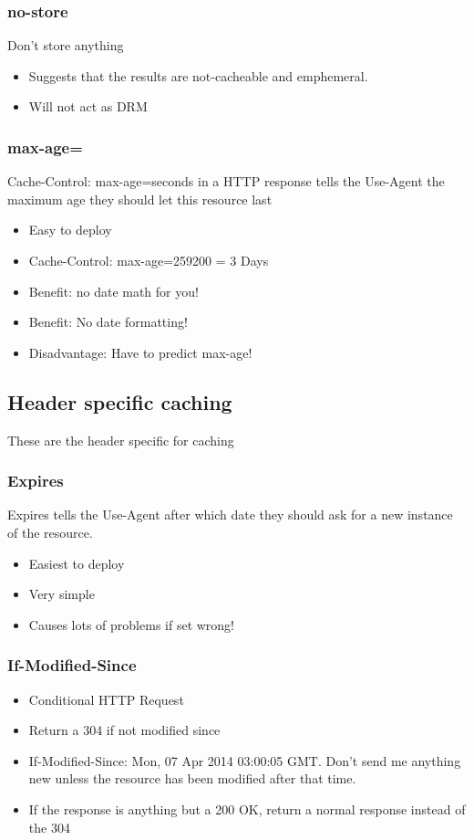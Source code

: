 \documentclass[../CMPUT-404-Notes.tex]{subfiles}
\begin{document}
\subsubsection{no-store}
Don't store anything
\begin{itemize}
    \item Suggests that the results are not-cacheable
    and emphemeral.
    \item Will not act as DRM
\end{itemize}

\subsubsection{max-age=}
Cache-Control: max-age=seconds in a HTTP
response tells the Use-Agent the maximum
age they should let this resource last
\begin{itemize}
    \item Easy to deploy
    \item Cache-Control: max-age=259200 = 3 Days
    \item Benefit: no date math for you!
    \item Benefit: No date formatting!
    \item Disadvantage: Have to predict max-age!
\end{itemize}

\subsection{Header specific caching}
These are the header specific for caching

\subsubsection{Expires}
Expires tells the Use-Agent after which date
they should ask for a new instance of the
resource.
\begin{itemize}
    \item Easiest to deploy
    \item Very simple
    \item Causes lots of problems if set wrong!
\end{itemize}

\subsubsection{If-Modified-Since}
\begin{itemize}
    \item Conditional HTTP Request
    \item Return a 304 if not modified since
    \item If-Modified-Since: Mon, 07 Apr 2014 03:00:05 GMT. Don't send me anything new unless the resource has
    been modified after that time.
    \item If the response is anything but a 200 OK, return a
    normal response instead of the 304
\end{itemize}
\end{document}
